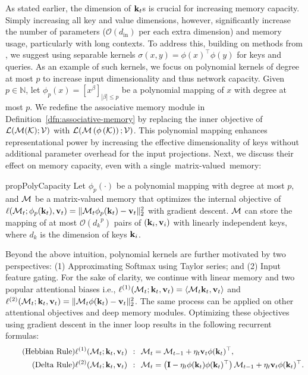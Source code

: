 As stated earlier, the dimension of $\mathbf{k}_t$s is crucial for increasing memory capacity. Simply increasing all key and value dimensions, however, significantly increase the number of parameters ($\mathcal{O}(d_{\text{in}})$ per each extra dimension) and memory usage, particularly with long contexts. To address this, building on methods from \citet{kacham2024polysketchformer, krotov2016dense}, we suggest using separable kernels $\sigma(x, y) = \phi(x)^{\top} \phi(y)$ for keys and queries. As an example of such kernels, we focus on polynomial kernels of degree at most $p$ to increase input dimensionality and thus network capacity. Given $p \in \mathbb{N}$,  let $\phi_{p}(x) = [x^{\beta}]_{|\beta| \leq p}$ be a polynomial mapping of $x$ with degree at most $p$. We redefine the associative memory module in Definition~\ref{dfn:associative-memory} by replacing the inner objective of $\mathcal{L}(\mathcal{M}(\mathcal{K}); \mathcal{V})$ with $\mathcal{L}(\mathcal{M}\left(\phi\left(\mathcal{K}\right)\right); \mathcal{V})$. This polynomial mapping enhances representational power by increasing the effective dimensionality of keys without additional parameter overhead for the input projections. Next, we discuss their effect on memory capacity, even with a single~matrix-valued~memory:


\begin{restatable}{prop}{PolyCapacity}\label{thm:polynomial-capacity}
 Let $\phi_p(\cdot)$ be a polynomial mapping with degree at most $p$, and $\mathcal{M}$ be a matrix-valued memory that optimizes the internal objective of $\ell(\mathcal{M}_t; \phi_p(\mathbf{k}_t), \mathbf{v}_t) = \|\mathcal{M}_t \phi_p(\mathbf{k}_t) - \mathbf{v}_t \|^2_2$ with gradient descent. $\mathcal{M}$ can store the mapping of at most $\mathcal{O}\left( {d_k}^{p} \right)$ pairs of $(\mathbf{k}_i, \mathbf{v}_i)$ with linearly independent keys, where $d_k$ is the dimension of keys $\mathbf{k}_i$. 
\end{restatable}
Beyond the above intuition, polynomial kernels are further motivated by two perspectives: (1) Approximating Softmax using Taylor series; and (2) Input feature gating. For the sake of clarity, we continue with linear memory and two popular attentional biases i.e., $\ell^{(1)}(\mathcal{M}_t; \mathbf{k}_t, \mathbf{v}_t) = \langle \mathcal{M}_t \mathbf{k}_t, \mathbf{v}_t \rangle$ and  $\ell^{(2)}(\mathcal{M}_t; \mathbf{k}_t, \mathbf{v}_t) = \| \mathcal{M}_t \phi(\mathbf{k}_t) - \mathbf{v}_t \|^2_2$.  The same process can be applied on other attentional objectives and deep memory modules. Optimizing these objectives using gradient descent in the inner loop results in the following recurrent formulas:
\begin{align} \tag{Hebbian Rule} \label{eq:heb}
    &\ell^{(1)}(\mathcal{M}_t; \mathbf{k}_t, \mathbf{v}_t)\:\: : \: \:\mathcal{M}_t = \mathcal{M}_{t-1} + \eta_t \mathbf{v}_t \phi(\mathbf{k}_t)^\top, \\ \tag{Delta Rule} \label{eq:delta}
    &\ell^{(2)}(\mathcal{M}_t; \mathbf{k}_t, \mathbf{v}_t)\:\: : \:\: \mathcal{M}_t = \left( \mathbf{I} - \eta_t \phi(\mathbf{k}_t) \phi(\mathbf{k}_t)^{\top}\right) \mathcal{M}_{t-1} + \eta_t \mathbf{v}_t \phi(\mathbf{k}_t)^{\top}.
\end{align}


